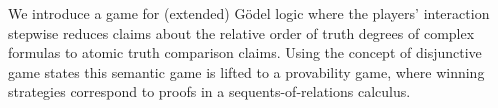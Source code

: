 
We introduce a game for (extended) G\"odel logic where the players'
interaction stepwise reduces claims about the relative order 
of truth degrees of complex formulas to atomic truth comparison claims.
Using the concept of disjunctive game states this semantic game is
lifted to a provability game, where winning strategies correspond to
proofs in a sequents-of-relations calculus.

